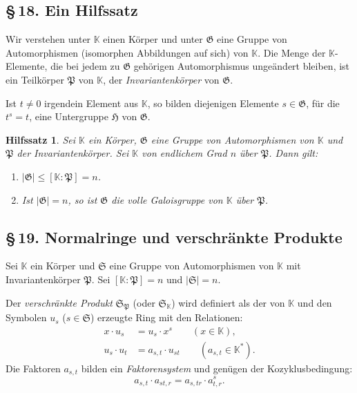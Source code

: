 \documentclass[10pt,a4paper]{article}
\theoremstyle{plain}
\newtheorem{hilfssatz}{Hilfssatz}[section]
\theoremstyle{definition}
\theoremstyle{remark}
\newcommand{\KK}{\mathbb{K}}
\begin{document}
\subsection*{\S\,18. Ein Hilfssatz}

Wir verstehen unter $\KK$ einen K\"orper und unter $\mathfrak{G}$ eine Gruppe von Automorphismen (isomorphen Abbildungen auf sich) von $\KK$. Die Menge der $\KK$-Elemente, die bei jedem zu $\mathfrak{G}$ geh\"origen Automorphismus unge\"andert bleiben, ist ein Teilk\"orper $\mathfrak{P}$ von $\KK$, der \emph{Invariantenk\"orper} von $\mathfrak{G}$.

Ist $t \neq 0$ irgendein Element aus $\KK$, so bilden diejenigen Elemente $s \in \mathfrak{G}$, f\"ur die $t^s = t$, eine Untergruppe $\mathfrak{H}$ von $\mathfrak{G}$.

\begin{hilfssatz}
Sei $\KK$ ein K\"orper, $\mathfrak{G}$ eine Gruppe von Automorphismen von $\KK$ und $\mathfrak{P}$ der Invariantenk\"orper. Sei $\KK$ von endlichem Grad $n$ \"uber $\mathfrak{P}$. Dann gilt:
\begin{enumerate}
\item $|\mathfrak{G}| \leq [\KK : \mathfrak{P}] = n$.
\item Ist $|\mathfrak{G}| = n$, so ist $\mathfrak{G}$ die volle Galoisgruppe von $\KK$ \"uber $\mathfrak{P}$.
\end{enumerate}
\end{hilfssatz}

\subsection*{\S\,19. Normalringe und verschr\"ankte Produkte}

Sei $\KK$ ein K\"orper und $\mathfrak{S}$ eine Gruppe von Automorphismen von $\KK$ mit Invariantenk\"orper $\mathfrak{P}$. Sei $[\KK : \mathfrak{P}] = n$ und $|\mathfrak{S}| = n$.

Der \emph{verschr\"ankte Produkt} $\mathfrak{S}_\mathfrak{P}$ (oder $\mathfrak{S}_\KK$) wird definiert als der von $\KK$ und den Symbolen $u_s$ ($s \in \mathfrak{S}$) erzeugte Ring mit den Relationen:
\begin{align*}
x \cdot u_s &= u_s \cdot x^s \qquad (x \in \KK),\\
u_s \cdot u_t &= a_{s,t} \cdot u_{st} \qquad (a_{s,t} \in \KK^*).
\end{align*}
Die Faktoren $a_{s,t}$ bilden ein \emph{Faktorensystem} und gen\"ugen der Kozyklusbedingung:
\[
a_{s,t} \cdot a_{st,r} = a_{s,tr} \cdot a_{t,r}^s.
\]
\end{document}
